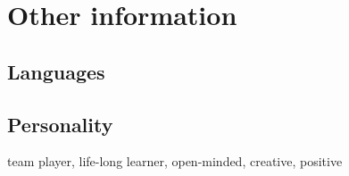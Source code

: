 \documentclass[letterpaper]{cv} %
\begin{document}
\section{Other information}

\subsection{Languages}
\begin{twentyshort} %
\end{twentyshort}

\subsection{Personality}
team player, life-long learner, open-minded, creative, positive



%




\end{document}
